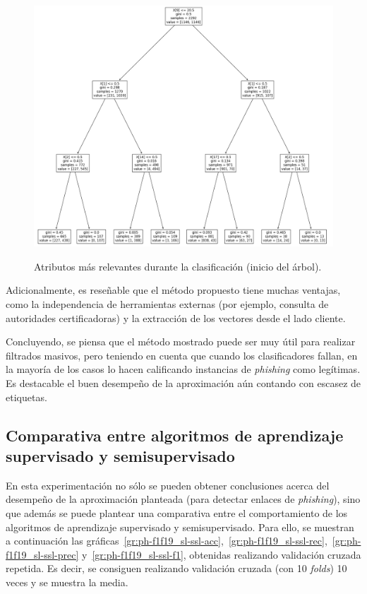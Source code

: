 \begin{figure}[h]
	\caption[\textit{Phishing}: detección (\texttt{f1-f19}, atributos relevantes DT)]{Atributos más relevantes durante la clasificación (inicio del árbol).}
	\centering
	\includegraphics[width=\textwidth]{../img/memoria/5_phishing/f1f19_tree}
	\label{gr:ph-f1f19_tree}
\end{figure}

Adicionalmente, es reseñable que el método propuesto tiene muchas ventajas, como la independencia de herramientas externas (por ejemplo, consulta de autoridades certificadoras) y la extracción de los vectores desde el lado cliente.

Concluyendo, se piensa que el método mostrado puede ser muy útil para realizar filtrados masivos, pero teniendo en cuenta que cuando los clasificadores fallan, en la mayoría de los casos lo hacen calificando instancias de \textit{phishing} como legítimas. Es destacable el buen desempeño de la aproximación aún contando con escasez de etiquetas.


\subsection{Comparativa entre algoritmos de aprendizaje supervisado y semisupervisado}

En esta experimentación no sólo se pueden obtener conclusiones acerca del desempeño de la aproximación planteada (para detectar enlaces de \textit{phishing}), sino que además se puede plantear una comparativa entre el comportamiento de los algoritmos de aprendizaje supervisado y semisupervisado. Para ello, se muestran a continuación las gráficas~\ref{gr:ph-f1f19_sl-ssl-acc},~\ref{gr:ph-f1f19_sl-ssl-rec},~\ref{gr:ph-f1f19_sl-ssl-prec} y~\ref{gr:ph-f1f19_sl-ssl-f1}, obtenidas realizando validación cruzada repetida. Es decir, se consiguen realizando validación cruzada (con 10 \textit{folds}) 10 veces y se muestra la media. 

